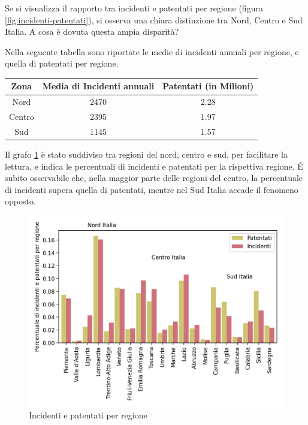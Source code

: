 \documentclass[a4paper]{report}
\begin{document}
Se si visualizza il rapporto tra incidenti e patentati per regione 
(figura \ref{fig:incidenti-patentati}), si osserva una chiara distinzione 
tra Nord, Centro e Sud Italia. 
A cosa è dovuta questa ampia disparità?

Nella seguente tabella sono riportate le medie di incidenti annuali per regione, 
e quella di patentati per regione.

\begin{center}
    \def\arraystretch{1.5}%
    \begin{tabular}{ |c|c|c| } 
    \hline
    Zona & Media di Incidenti annuali & Patentati (in Milioni) \\ 
    \hline
    \rowcolor{TableGray}
    Nord    &   2470 &   2.28 \\ 
    Centro  &   2395 &   1.97 \\ 
    \rowcolor{TableGray}
    Sud     &   1145 &   1.57 \\ 
    \hline
    \end{tabular}
\end{center}

Il grafo \ref{fig:incidenti-patentati-bar} è stato suddiviso tra regioni del nord, 
centro e sud, per facilitare la lettura, e indica le percentuali di incidenti e 
patentati per la rispettiva regione. 
\'E subito osservabile che, nella maggior parte delle regioni del centro, 
la percentuale di incidenti supera quella di patentati, 
mentre nel Sud Italia accade il fenomeno opposto.

\begin{figure}
    \includegraphics[width=\linewidth]{../src/incidenti/incidenti_aci/mappe_regioni/incidenti_patenti_bar.png}
    \caption{Incidenti e patentati per regione}
    \label{fig:incidenti-patentati-bar}
\end{figure}
\end{document}
